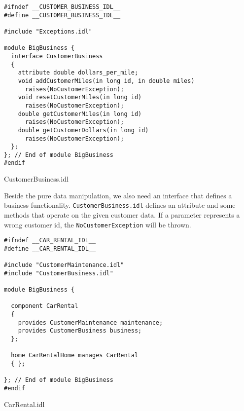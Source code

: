 \newpage

\begin{Example}
\begin{minifbox}
\begin{small}
\begin{verbatim}
#ifndef __CUSTOMER_BUSINESS_IDL__
#define __CUSTOMER_BUSINESS_IDL__

#include "Exceptions.idl"

module BigBusiness {
  interface CustomerBusiness
  {
    attribute double dollars_per_mile;
    void addCustomerMiles(in long id, in double miles) 
      raises(NoCustomerException);
    void resetCustomerMiles(in long id) 
      raises(NoCustomerException);
    double getCustomerMiles(in long id) 
      raises(NoCustomerException);
    double getCustomerDollars(in long id) 
      raises(NoCustomerException);
  };
}; // End of module BigBusiness
#endif
\end{verbatim}
\end{small}
\end{minifbox}
\caption{CustomerBusiness.idl}
\label{example:}
\end{Example}

Beside the pure data manipulation, we also need an interface that defines a
business functionality.
{\tt CustomerBusiness.idl} defines an attribute and some methods that operate
on the given customer data. 
If a parameter represents a wrong customer id, the {\tt NoCustomerException}
will be thrown.

\begin{Example}
\begin{minifbox}
\begin{small}
\begin{verbatim}
#ifndef __CAR_RENTAL_IDL__
#define __CAR_RENTAL_IDL__

#include "CustomerMaintenance.idl"
#include "CustomerBusiness.idl"

module BigBusiness {

  component CarRental 
  { 
    provides CustomerMaintenance maintenance;
    provides CustomerBusiness business;
  };
  
  home CarRentalHome manages CarRental 
  { };

}; // End of module BigBusiness
#endif
\end{verbatim}
\end{small}
\end{minifbox}
\caption{CarRental.idl}
\label{example:component}
\end{Example}


